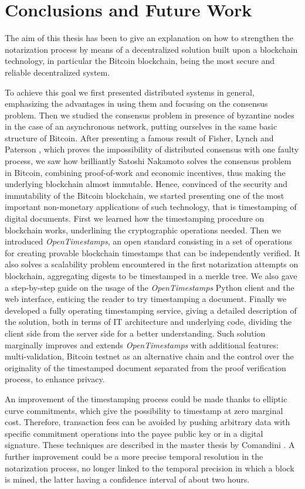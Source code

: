 \chapter{Conclusions and Future Work}
\label{chpr:conclusions}
The aim of this thesis has been to give an explanation on how to strengthen the notarization process by means of a decentralized solution built upon a blockchain technology, in particular the Bitcoin blockchain, being the most secure and reliable decentralized system.

\bigskip
\noindent
To achieve this goal we first presented distributed systems in general, emphasizing the advantages in using them and focusing on the consensus problem. Then we studied the consensus problem in presence of byzantine nodes in the case of an asynchronous network, putting ourselves in the same basic structure of Bitcoin. After presenting a famous result of Fisher, Lynch and Paterson \cite{Fischer:1985:IDC:3149.214121}, which proves the impossibility of distributed consensus with one faulty process, we saw how brilliantly Satoshi Nakamoto solves the consensus problem in Bitcoin, combining proof-of-work and economic incentives, thus making the underlying blockchain almost immutable. Hence, convinced of the security and immutability of the Bitcoin blockchain, we started presenting one of the most important non-monetary applications of such technology, that is timestamping of digital documents. First we learned how the timestamping procedure on blockchain works, underlining the cryptographic operations needed. Then we introduced \textit{OpenTimestamps}, an open standard consisting in a set of operations for creating provable blockchain timestamps that can be independently verified. It also solves a scalability problem encountered in the first notarization attempts on blockchain, aggregating digests to be timestamped in a merkle tree. We also gave a step-by-step guide on the usage of the \textit{OpenTimestamps} Python client and the web interface, enticing the reader to try timestamping a document. Finally we developed a fully operating timestamping service, giving a detailed description of the solution, both in terms of IT architecture and underlying code, dividing the client side from the server side for a better understanding. Such solution marginally improves and extends \textit{OpenTimestamps} with additional features: multi-validation, Bitcoin testnet as an alternative chain and the control over the originality of the timestamped document separated from the proof verification process, to enhance privacy.

\bigskip
\noindent
An improvement of the timestamping process could be made thanks to elliptic curve commitments, which give the possibility to timestamp at zero marginal cost. Therefore, transaction fees can be avoided by pushing arbitrary data with specific commitment operations into the payee public key or in a digital signature. These techniques are described in the master thesis by Comandini \cite{Comandini:Thesis:2018}. A further improvement could be a more precise temporal resolution in the notarization process, no longer linked to the temporal precision in which a block is mined, the latter having a confidence interval of about two hours.
